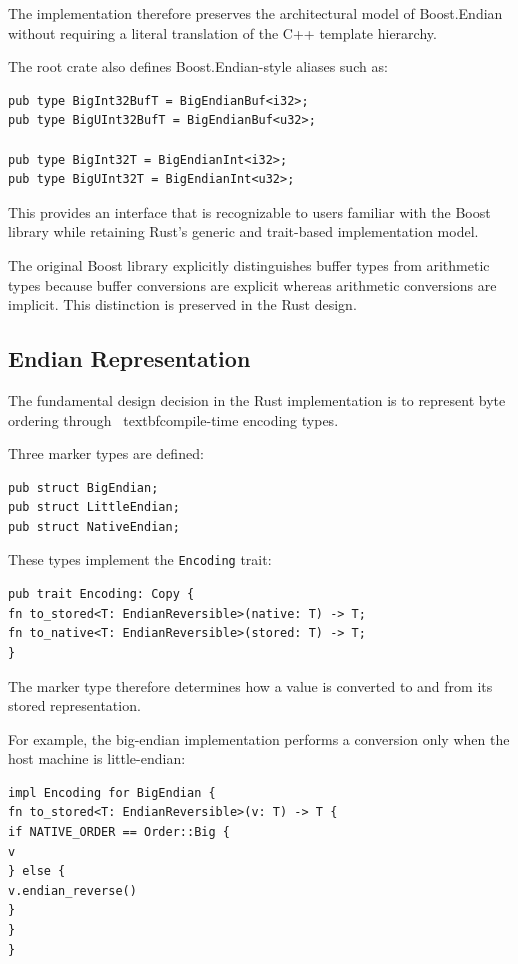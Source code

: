 The implementation therefore preserves the architectural model of Boost.Endian without requiring a literal 
translation of the C++ template hierarchy.

The root crate also defines Boost.Endian-style aliases such as:

\begin{lstlisting}[style=rustblock]
pub type BigInt32BufT = BigEndianBuf<i32>;
pub type BigUInt32BufT = BigEndianBuf<u32>;

pub type BigInt32T = BigEndianInt<i32>;
pub type BigUInt32T = BigEndianInt<u32>;
\end{lstlisting}

This provides an interface that is recognizable to users familiar with the Boost library while retaining Rust's 
generic and trait-based implementation model.

The original Boost library explicitly distinguishes buffer types from arithmetic types because buffer conversions 
are explicit whereas arithmetic conversions are implicit. This distinction is preserved in the Rust design.


\subsection{Endian Representation}
The fundamental design decision in the Rust implementation is to represent byte ordering through \
textbf{compile-time encoding types}.

Three marker types are defined:

\begin{lstlisting}[style=rustblock]
pub struct BigEndian;
pub struct LittleEndian;
pub struct NativeEndian;
\end{lstlisting}

These types implement the \texttt{Encoding} trait:

\begin{lstlisting}[style=rustblock]
pub trait Encoding: Copy {
fn to_stored<T: EndianReversible>(native: T) -> T;
fn to_native<T: EndianReversible>(stored: T) -> T;
}
\end{lstlisting}

The marker type therefore determines how a value is converted to and from its stored representation.

For example, the big-endian implementation performs a conversion only when the host machine is little-endian:

\begin{lstlisting}[style=rustblock]
impl Encoding for BigEndian {
fn to_stored<T: EndianReversible>(v: T) -> T {
if NATIVE_ORDER == Order::Big {
v
} else {
v.endian_reverse()
}
}
}
\end{lstlisting}


